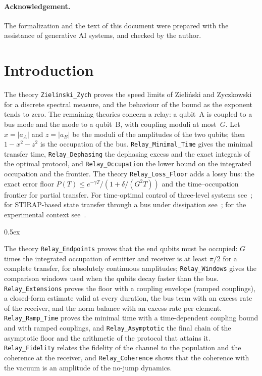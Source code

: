 \documentclass[10pt,a4paper]{article}
\begin{document}
\paragraph{Acknowledgement.} The formalization and the text of this document were prepared with the
assistance of generative AI systems, and checked by the author.

\tableofcontents

\section*{Introduction}

The theory \texttt{Zielinski\_Zych} proves the speed limits of Zieli\'nski and Zyczkowski~\cite{ZZ06} for a discrete
spectral measure, and the behaviour of the bound as the exponent tends to zero. The remaining theories concern a relay:
a qubit~A is coupled to a bus mode and the mode to a qubit~B, with coupling moduli at most~$G$. Let $x=|a_A|$ and
$z=|a_B|$ be the moduli of the amplitudes of the two qubits; then $1-x^2-z^2$ is the occupation of the bus.
\texttt{Relay\_Minimal\_Time} gives the minimal transfer time, \texttt{Relay\_Dephasing} the dephasing excess and
the exact integrals of the optimal protocol, and \texttt{Relay\_Occupation} the lower bound on the integrated
occupation and the frontier. The theory \texttt{Relay\_Loss\_Floor} adds a lossy bus: the exact error floor
$P(T)\le e^{-\gamma T}/(1+\delta/(G^2T))$ and the time--occupation frontier for partial transfer. For time-optimal control of three-level systems see~\cite{BCC05}; for STIRAP-based
state transfer through a bus under dissipation see~\cite{WYC17}; for the experimental context
see~\cite{SUN26,MAR26}.

\parindent 0pt\parskip 0.5ex

The theory \texttt{Relay\_Endpoints} proves that the end qubits must be occupied: $G$ times the
integrated occupation of emitter and receiver is at least $\pi/2$ for a complete transfer, for
absolutely continuous amplitudes; \texttt{Relay\_Windows} gives the comparison windows used when the
qubits decay faster than the bus. \texttt{Relay\_Extensions} proves the floor with a coupling envelope
(ramped couplings), a closed-form estimate valid at every duration, the bus term with an excess rate of the
receiver, and the norm balance with an excess rate per element. \texttt{Relay\_Ramp\_Time} proves the minimal time with a time-dependent coupling bound and with ramped
couplings, and \texttt{Relay\_Asymptotic} the final chain of the asymptotic floor and the arithmetic of the protocol
that attains it. \texttt{Relay\_Fidelity} relates the fidelity of the channel to the population and the coherence at the
receiver, and \texttt{Relay\_Coherence} shows that the coherence with the vacuum is an amplitude of the
no-jump dynamics.





\end{document}
